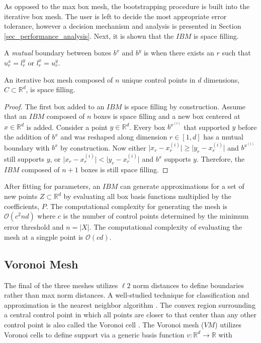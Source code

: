 As opposed to the max box mesh, the bootstrapping procedure is built into the iterative box mesh. The user is left to decide the most appropriate error tolerance, however a decision mechanism and analysis is presented in Section \ref{sec_performance_analysis}. Next, it is shown that the $IBM$ is space filling.

\begin{definition}
A \textit{mutual} boundary between boxes $b^x$ and $b^y$ is when there exists an $r$ such that $u^x_r = l^y_r$ or $l^x_r = u^y_r$.
\end{definition}

\begin{theorem} An iterative box mesh composed of $n$ unique control points in $d$ dimensions, $C \subset \mathbb{R}^d$, is space filling. \end{theorem}
\begin{proof}
The first box added to an $IBM$ is space filling by construction. Assume that an $IBM$ composed of $n$ boxes is space filling and a new box centered at $x \in \mathbb{R}^d$ is added. Consider a point $y \in \mathbb{R}^d$. Every box $b^{x^{(i)}}$ that supported $y$ before the addition of $b^x$ and was reshaped along dimension $r \in [1,d]$ has a mutual boundary with $b^x$ by construction. Now either $\bigl| x_r - x^{(i)}_r \bigr| \geq \bigl| y_r - x^{(i)}_r \bigr|$ and $b^{x^{(i)}}$ still supports $y$, or $\bigl| x_r - x^{(i)}_r \bigr| < \bigl| y_r - x^{(i)}_r \bigr|$ and $b^x$ supports $y$. Therefore, the $IBM$ composed of $n+1$ boxes is still space filling.
\end{proof}

After fitting for parameters, an $IBM$ can generate approximations for a set of new points $Z \subset \mathbb{R}^d$ by evaluating all box basis functions multiplied by the coefficients, $P$. The computational complexity for generating the mesh is $\mathcal{O}(c^2 n d)$ where $c$ is the number of control points determined by the minimum error threshold and $n = |X|$. The computational complexity of evaluating the mesh at a singple point is $\mathcal{O}(c d)$.

\subsection{Voronoi Mesh}

The final of the three meshes utilizes $\ell2$ norm distances to define boundaries rather than max norm distances. A well-studied technique for classification and approximation is the nearest neighbor algorithm \cite{cover1967nearest}. The convex region surrounding a central control point in which all points are closer to that center than any other control point is also called the Voronoi cell \cite{dirichlet1850reduction}. The Voronoi mesh ($VM$) utilizes Voronoi cells to define support via a generic basis function $v: \mathbb{R}^d \rightarrow \mathbb{R}$ with

